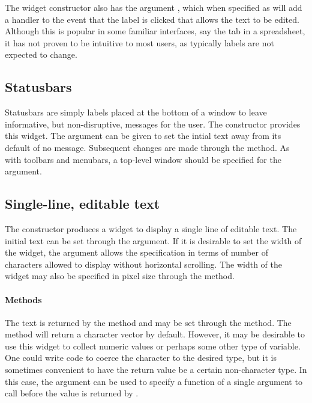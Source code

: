 The widget constructor also has the argument
, which when specified as  will
add a handler to the event that the label is clicked that allows the
text to be edited.  Although this is popular in some familiar
interfaces, say the tab in a spreadsheet, it has not proven to be
intuitive to most users, as typically labels are not expected to
change.


\subsection{Statusbars}
\label{sec:gWidgets-statusbars}

Statusbars are simply labels placed at the bottom of a window to leave
informative, but non-disruptive, messages for the user.  The
 constructor provides this widget.  The argument
 can be given to set the intial text away
from its default of no message. Subsequent changes are made through
the  method. As with toolbars and
menubars, a top-level window should be specified for the
 argument.



\subsection{Single-line, editable text}
\label{sec:gWidgets-single-line-editable}

The  constructor produces a widget to display a
single line of editable text. The initial text can be set through the
 argument. 
If it is desirable to set the width of the widget, the
 argument allows the specification in terms of
number of characters allowed to display without horizontal scrolling. The width
of the widget may also be specified in pixel size through the
 method.


\paragraph{Methods}
The text is returned by the
 method and may be set through the
 method.
The  method will return a character vector by
default. However, it may be desirable to use this widget to collect
numeric values or perhaps some other type of variable. One could write
code to coerce the character to the desired type, but it is sometimes
convenient to have the return value be a certain non-character
type. In this case, the  argument can be
used to specify a function of a single argument to call before the
value is returned by .

